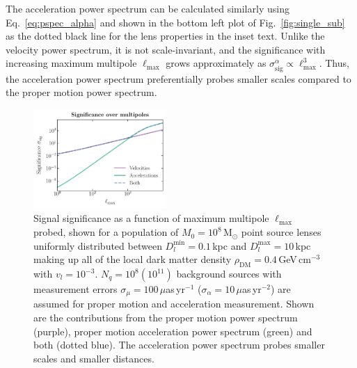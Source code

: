 \documentclass[twocolumn]{aastex63}
\begin{document}
The acceleration power spectrum can be calculated similarly using Eq.~\ref{eq:pspec_alpha} and shown in the bottom left plot of Fig.~\ref{fig:single_sub} as the dotted black line for the lens properties in the inset text. Unlike the velocity power spectrum, it is not scale-invariant, and the significance with increasing maximum multipole $\ell_\mathrm{max}$ grows approximately as $\sigma_\mathrm{sig}^\alpha\propto\ell_\mathrm{max}^3$. Thus, the acceleration power spectrum preferentially probes smaller scales compared to the proper motion power spectrum. 

\begin{figure}[htbp]
  \centering
  \includegraphics[width=0.45\textwidth]{plots/mualpha_compact}
  \caption{Signal significance as a function of maximum multipole $\ell_\mathrm{max}$ probed, shown for a population of $M_0=10^8$\,M$_\odot$ point source lenses uniformly distributed between $D_l^{\mathrm{min}}=0.1$\,kpc and $D_l^{\mathrm{max}}=10$\,kpc making up all of the local dark matter density $\rho_\mathrm{DM}=0.4$\,GeV\,cm$^{-3}$ with $v_l=10^{-3}$. $N_q=10^8 (10^{11})$ background sources with measurement errors $\sigma_\mu=100\,\mu$as\,yr$^{-1}$ ($\sigma_\alpha=10\,\mu$as\,yr$^{-2}$) are assumed for proper motion and acceleration measurement. Shown are the contributions from the proper motion power spectrum (purple), proper motion acceleration power spectrum (green) and both (dotted blue). The acceleration power spectrum probes smaller scales and smaller distances.} 
  \label{fig:mualpha_compact}
\end{figure}
\end{document}
